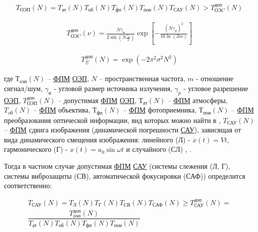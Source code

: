 \begin{equation}
\label{eq:p2:2.5}
\begin{alignedat}{2}
T_{\textit{ОЭП}}(N)=
T_{\textit{ат}}(N)T_{\textit{об}}(N)T_{\textit{фп}}(N)T_{\textit{пои}}(N)T_{\textit{САУ}}(N)>
T_{\textit{ОЭC}}^{\textit{доп}}(N)
\end{alignedat}
\end{equation}

\begin{equation}
\label{eq:p2:3}
\begin{alignedat}{2}
T_{\textit{ОЭC}}^{\textit{доп}}\left(\nu{}\right)=
\frac{N{\gamma{}}_\textit{и}}{2\sin{\left(N\frac{{\gamma{}}_\textit{и}}{2}\right)}}
\exp{\left[-\frac{{\left(N{\gamma{}}_p\right)}^2}{16\ln{\left(2m\right)}}\right]}
\end{alignedat}
\end{equation}

\begin{equation}
\label{eq:p2:4}
\begin{alignedat}{2}
T_{\Sigma{}}^{\textit{доп}}\left(N\right)=\exp{\left(-2{\pi{}}^2{\sigma{}}^2N^2\right)}
\end{alignedat}
\end{equation}

где 
$Т_{\textit{оэп}}(N)$ – \hyperref[acroFPM]{ФПМ} \hyperref[acroEOS]{ОЭП}, 
$N$ – пространственная частота, 
$m$ - отношение сигнал/шум, 
$\gamma_\textit{и}$ - угловой размер источника излучения, 
$\gamma_\textit{p}$ - угловое разрешение \hyperref[acroEOS]{ОЭП}, 
$T_{\textit{ОЭП}}^{\textit{доп}}(N)$ – допустимая \hyperref[acroFPM]{ФПМ} \hyperref[acroEOS]{ОЭП}, 
$Т_\textit{ат}(N)$ – \hyperref[acroFPM]{ФПМ} атмосферы, 
$T_\textit{oб}(N)$ – \hyperref[acroFPM]{ФПМ} объектива, 
$Т_\textit{фп}(N)$ – \hyperref[acroFPM]{ФПМ} фотоприемника, 
$Т_\textit{пои}(N)$ – \hyperref[acroFPM]{ФПМ} преобразования оптической информации, вид которых можно найти в \cite[]{Tarasov}, 
$T_{\textit{САУ}}(N)$ – \hyperref[acroFPM]{ФПМ} сдвига изображения (динамической погрешности \hyperref[acroSAU]{САУ}), зависящая от вида динамического смещения изображения: линейного (Л) - $\dot{x}(t) = Vt$, 
гармонического (Г) - $x(t)=a_{0}\sin{\omega t}$ и 
случайного (СЛ) \cite[]{Tarasov}, \cite[]{Sokolski22}.

Тогда в частном случае допустимая \hyperref[acroFPM]{ФПМ} \hyperref[acroSAU]{САУ} (системы слежения (Л, Г), системы виброзащиты (СВ), автоматической фокусировки (САФ)) определится соответственно: 

\begin{equation}
\label{eq:p2:6}
\begin{alignedat}{2}
T_{\textit{САУ}}\left(N\right)=
T_\textit{Л}\left(N\right)T_\textit{Г}\left(N\right)T_{\textit{СВ}}\left(N\right)T_{\textit{САФ}}\left(N\right)\geq{}T_{\textit{САУ}}^{\textit{доп}}(N)= \\
\dfrac{ T_{\textit{оэп}}^{\textit{доп}}(N) }{ T_{\textit{ат}}(N)T_{\textit{об}}(N)T_{\textit{фп}}(N)T_{\textit{пои}}(N) }
\end{alignedat}
\end{equation}

